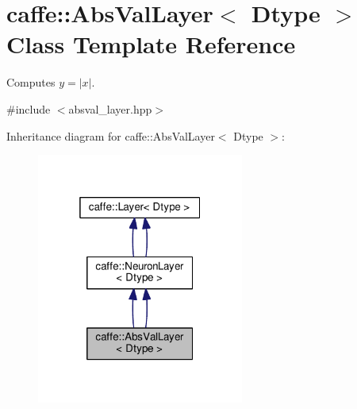 \hypertarget{classcaffe_1_1_abs_val_layer}{}\section{caffe\+:\+:Abs\+Val\+Layer$<$ Dtype $>$ Class Template Reference}
\label{classcaffe_1_1_abs_val_layer}


Computes $ y = |x| $.  




{\ttfamily \#include $<$absval\+\_\+layer.\+hpp$>$}



Inheritance diagram for caffe\+:\+:Abs\+Val\+Layer$<$ Dtype $>$\+:
\nopagebreak
\begin{figure}[H]
\begin{center}
\leavevmode
\includegraphics[width=193pt]{classcaffe_1_1_abs_val_layer__inherit__graph}
\end{center}
\end{figure}
